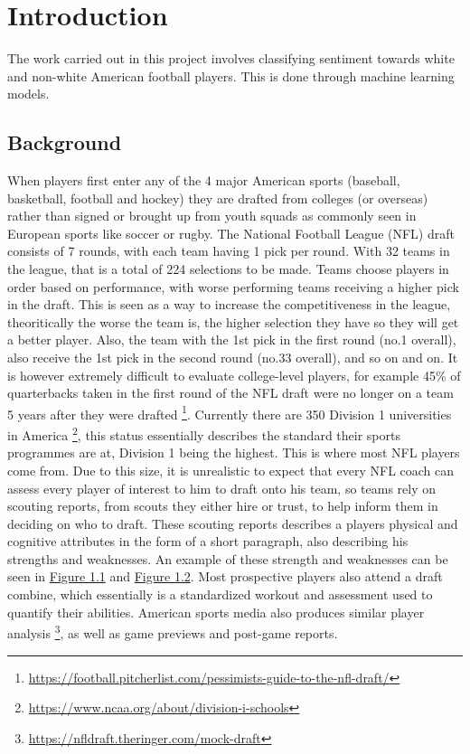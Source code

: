 \documentclass[oneside,12pt]{Classes/RoboticsLaTeX}
\begin{document}
\mainmatter

\chapter{Introduction}
\label{chap:introduction}
\setcounter{page}{7}
The work carried out in this project involves classifying sentiment towards white and non-white
American football players. This is done through machine learning models.

\section{Background}
When players first enter any of the 4 major American sports (baseball, basketball, football and hockey) they are
drafted from colleges (or overseas) rather than signed or brought up from youth squads as commonly seen in
European sports like soccer or rugby. The National Football League (NFL) draft consists of 7 rounds, with each team
having 1 pick per round. With 32 teams in the league, that is a total of 224 selections to be made. Teams choose players in order based on performance, with worse performing teams 
receiving a higher pick in the draft. This is seen as a way to increase the competitiveness in the league, theoritically the worse the 
team is, the higher selection they have so they will get a better player. Also, the team with the 1st pick in the first round (no.1 overall), also 
receive the 1st pick in the second round (no.33 overall), and so on and on. It is however extremely difficult to evaluate college-level players,
for example 45\% of quarterbacks taken in the first round of the NFL draft were no longer on a team 5 years after they were drafted \footnote{\url{https://football.pitcherlist.com/pessimists-guide-to-the-nfl-draft/}}.
Currently there are 350 Division 1 universities in America \footnote{\url{https://www.ncaa.org/about/division-i-schools}}, this status
essentially describes the standard their sports programmes are at, Division 1 being the highest. This is where most
NFL players come from. Due to this size, it is unrealistic to expect that every NFL coach can assess every player of
interest to him to draft onto his team, so teams rely on scouting reports, from scouts they either hire or trust, to
help inform them in deciding on who to draft. These scouting reports describes a players physical and cognitive
attributes in the form of a short paragraph, also describing his strengths and weaknesses. An example of these strength and weaknesses can be seen in \hyperref[fig:bateman_s]{Figure 1.1} and \hyperref[fig:bateman_w]{Figure 1.2}. 
Most prospective players also attend a draft combine, which essentially is a standardized workout and assessment used to quantify their abilities. American sports media also produces
similar player analysis \footnote{\url{https://nfldraft.theringer.com/mock-draft}}, as well as game previews and post-game reports.
\end{document}
